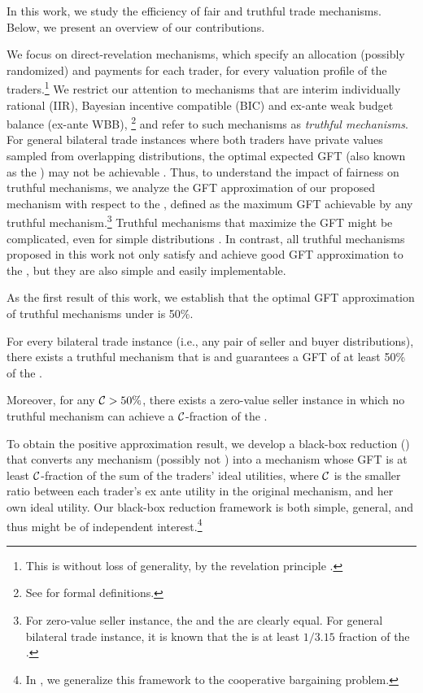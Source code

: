 \label{subsec:contribution}
In this work, we study the efficiency of fair and truthful trade mechanisms. Below, we present
an overview of our contributions.

We focus on direct-revelation mechanisms, which specify an allocation (possibly randomized) and payments for each trader, for every valuation profile of the traders.\footnote{This is without loss of generality, by the revelation principle \citep{mye-81}.}
We restrict our attention to mechanisms that are interim individually rational (IIR), Bayesian incentive compatible (BIC) and ex-ante weak budget balance (ex-ante WBB),
\footnote{\label{footnote:reference to prelim}See  for formal definitions.} and refer to such mechanisms as \emph{truthful mechanisms}.   
For general bilateral trade instances where both traders have private values sampled from overlapping distributions, the optimal expected GFT (also known as the {\FirstBest}) may not be achievable \citep{MS-83}. Thus, to understand the impact of fairness on truthful mechanisms, we analyze the GFT approximation of our proposed mechanism with respect to the {\SecondBest}, defined as the maximum GFT achievable by any truthful mechanism.\footnote{For zero-value seller instance, the {\FirstBest} and the {\SecondBest} are clearly equal. For general bilateral trade instance, it is known that the {\SecondBest} is at least ${1}/{3.15}$ fraction of the {\FirstBest} \citep{DMSW-22,Fei-22}.}
Truthful mechanisms that maximize the GFT might be complicated, even for simple distributions \citep{MS-83}. 
In contrast, all truthful mechanisms proposed in this work not only satisfy {\ksfairness} and achieve good GFT approximation to the {\SecondBest}, but they are also simple and easily implementable.


As the first result of this work, we establish that the optimal GFT approximation of truthful mechanisms under {\ksfairness} is 50\%.

\begin{informal}
\label{infmthm:general}
For every bilateral trade instance (i.e., any pair of seller and buyer distributions), there exists a truthful mechanism that is {\ksfair} and guarantees a GFT of at least 50\% of the {\SecondBest}.

Moreover, for any $\mathcal{C} > 50\%$, there exists a zero-value seller instance in which no {\ksfair} truthful mechanism can achieve a 
$\mathcal{C}$-fraction of the {\SecondBest}. 
\end{informal}
To obtain the positive approximation result, we develop a black-box reduction () that converts any mechanism (possibly not {\ksfair}) into a {\ksfair} mechanism whose GFT is at least $\mathcal{C}$-fraction of the sum of the traders’ ideal utilities, where $\mathcal{C}$ is the smaller ratio between each trader's ex ante utility in the original mechanism, and her own ideal utility.
Our black-box reduction framework is both simple, general, and thus might be of independent interest.\footnote{In , we generalize this framework to the cooperative bargaining problem.}
 
